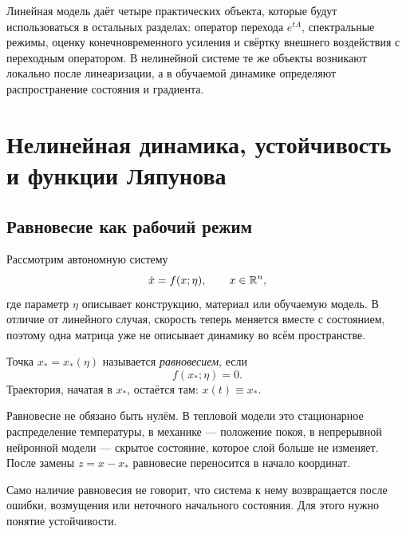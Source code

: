 Линейная модель даёт четыре практических объекта, которые будут использоваться в остальных разделах: оператор перехода $e^{tA}$, спектральные режимы, оценку конечновременного усиления и свёртку внешнего воздействия с переходным оператором. В нелинейной системе те же объекты возникают локально после линеаризации, а в обучаемой динамике определяют распространение состояния и градиента.

\section{Нелинейная динамика, устойчивость и функции Ляпунова}
\label{sec:nonlinear-stability-lyapunov}

\subsection{Равновесие как рабочий режим}

Рассмотрим автономную систему
\begin{equation}
\label{eq:nonlinear-autonomous-v03}
\dot x=f(x;\eta),
\qquad
x\in\mathbb{R}^n,
\end{equation}
где параметр $\eta$ описывает конструкцию, материал или обучаемую модель. В отличие от линейного случая, скорость теперь меняется вместе с состоянием, поэтому одна матрица уже не описывает динамику во всём пространстве.

\begin{definition}
Точка $x_*=x_*(\eta)$ называется \emph{равновесием}, если
\begin{equation}
\label{eq:equilibrium-v03}
f(x_*;\eta)=0.
\end{equation}
Траектория, начатая в $x_*$, остаётся там: $x(t)\equiv x_*$.
\end{definition}

Равновесие не обязано быть нулём. В тепловой модели это стационарное распределение температуры, в механике --- положение покоя, в непрерывной нейронной модели --- скрытое состояние, которое слой больше не изменяет. После замены $z=x-x_*$ равновесие переносится в начало координат.

Само наличие равновесия не говорит, что система к нему возвращается после ошибки, возмущения или неточного начального состояния. Для этого нужно понятие устойчивости.

